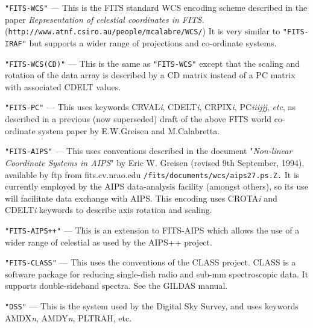 \documentclass[twoside,11pt]{article}
\newcommand{\htmladdnormallink}[2]{#1}
\newcommand{\latex}[1]{#1}
\newcommand{\sstitem}{\item}
\newcommand{\sstitem}{\item}
\begin{document}
{{{         \sstitem
         \texttt{"FITS-WCS"} --- This is the FITS standard WCS encoding 
         scheme described in the paper 
         \htmladdnormallink{\textit{Representation of celestial coordinates in FITS.}}
         {http://www.atnf.csiro.au/people/mcalabre/WCS/}\\ \latex{
         (\texttt{http://www.atnf.csiro.au/people/mcalabre/WCS/})}  It is
         very similar to \texttt{"FITS-IRAF"} but supports a wider range of
         projections and co-ordinate systems.

         \sstitem
         \texttt{"FITS-WCS(CD)"} --- This is the same as \texttt{"FITS-WCS"}
         except that the scaling and rotation of the data array is described by a 
         CD matrix instead of a PC matrix with associated CDELT values.

         \sstitem
         \texttt{"FITS-PC"} --- This uses keywords CRVAL\textit{i},
         CDELT\textit{i}, CRPIX\textit{i}, PC\textit{iiijjj}, 
         \textit{etc}, as described in a previous (now superseded) draft of
         the above FITS world co-ordinate system paper by E.W.Greisen and 
         M.Calabretta.

         \sstitem
         \texttt{"FITS-AIPS"} --- This uses conventions described in the
         document "\textit{Non-linear Coordinate Systems in AIPS}" by
         Eric W. Greisen (revised 9th September, 1994), available by ftp
         from fits.cv.nrao.edu \texttt{/fits/documents/wcs/aips27.ps.Z.}
         It is currently employed by the AIPS data-analysis facility
         (amongst others), so its use
         will facilitate data exchange with AIPS. This encoding uses
         CROTA\textit{i} and CDELT\textit{i} keywords to describe axis
         rotation and scaling.

         \sstitem 
         \texttt{"FITS-AIPS++"} --- This is an extension to FITS-AIPS which 
         allows the use of a wider range of celestial as used by the AIPS++ 
         project.

         \sstitem
         \texttt{"FITS-CLASS"} --- This uses the conventions of the CLASS
         project.  CLASS is a software package for reducing single-dish 
         radio and sub-mm spectroscopic data.  It supports double-sideband 
         spectra.  See \htmladdnormallink{the GILDAS 
         manual}{http://www.iram.fr/IRAMFR/GILDAS/doc/html/class-html/class.html}.

         \sstitem
         \texttt{"DSS"} --- This is the system used by the Digital Sky Survey, and
         uses keywords AMDX\textit{n}, AMDY\textit{n}, PLTRAH, etc.

}}}
\end{document}
